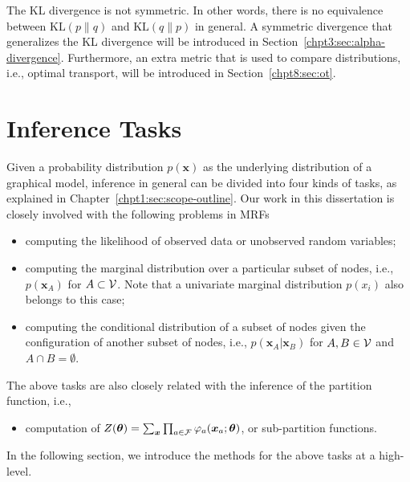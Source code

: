 The KL divergence is not symmetric. In other words, there is no equivalence between $\mathrm{KL}(p\|q)$ and $\mathrm{KL}(q\|p)$ in general. A symmetric divergence that generalizes the KL divergence will be introduced in Section~\ref{chpt3:sec:alpha-divergence}. Furthermore, an extra metric that is used to compare distributions, i.e., optimal transport, will be introduced in Section~\ref{chpt8:sec:ot}.



\section{Inference Tasks}


Given a probability distribution $p(\bm{x})$ as the underlying distribution of a graphical model, inference in general can be divided into four kinds of tasks, as explained in Chapter~\ref{chpt1:sec:scope-outline}. Our work in this dissertation is closely involved with the following problems in MRFs
\begin{itemize}
\item computing the likelihood of observed data or unobserved random variables;
\item computing the marginal distribution over a particular subset of nodes, i.e., $p(\bm{x}_A)$ for $A \subset \mathcal{V}$. Note that a univariate marginal distribution $p(x_i)$ also belongs to this case;
\item computing the conditional distribution of a subset of nodes given the configuration of another subset of nodes, i.e., $p(\bm{x}_A| \bm{x}_B)$ for $A, B \in \mathcal{V}$ and $A \cap B = \emptyset$.
\end{itemize}
The above tasks are also closely related with the inference of the partition function, i.e.,
\begin{itemize}
\item computation of $Z(\bm{\theta}) = \sum_{\bm{x}} \prod_{a \in \mathcal{F}} \varphi_{a}(\bm{x}_{a};\bm{\theta})$, or sub-partition functions.
\end{itemize}

In the following section, we introduce the methods for the above tasks at a high-level.

